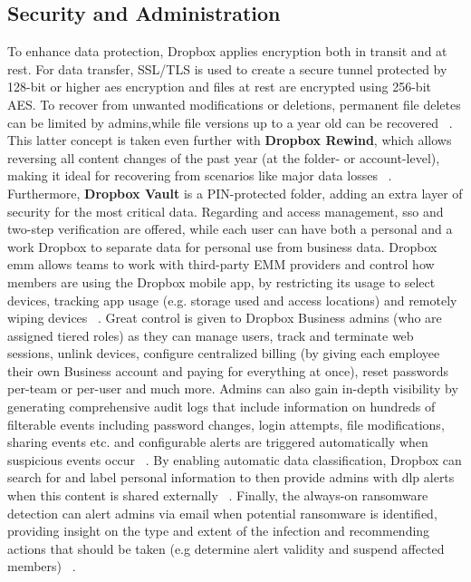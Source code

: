 \subsection{Security and Administration}
To enhance data protection, Dropbox applies encryption both in transit and at rest. For data transfer, SSL/TLS is used to create a secure tunnel protected by 128-bit or higher \ac{aes} encryption and files at rest are encrypted using 256-bit AES. To recover from unwanted modifications or deletions, permanent file deletes can be limited by admins,while file versions up to a year old can be recovered ~\cite{dropbox_security}. This latter concept is taken even further with \textbf{Dropbox Rewind}, which allows reversing all content changes of the past year (at the folder- or account-level), making it ideal for recovering from scenarios like major data losses ~\cite{dropbox_rewind}. Furthermore, \textbf{Dropbox Vault} is a PIN-protected folder, adding an extra layer of security for the most critical data. Regarding and access management, \ac{sso} and two-step verification are offered, while each user can have both a personal and a work Dropbox to separate data for personal use from business data. Dropbox \ac{emm} allows teams to work with third-party EMM providers and control how members are using the Dropbox mobile app, by restricting its usage to select devices, tracking app usage (e.g. storage used and access locations) and remotely wiping devices ~\cite{dropbox_emm}. Great control is given to Dropbox Business admins (who are assigned tiered roles) as they can manage users, track and terminate web sessions, unlink devices, configure centralized billing (by giving each employee their own Business account and paying for everything at once), reset passwords per-team or per-user and much more.  Admins can also gain in-depth visibility by generating comprehensive audit logs that include information on hundreds of filterable events including password changes, login attempts, file modifications, sharing events etc. and configurable alerts are triggered automatically when suspicious events occur ~\cite{dropbox_admin}. By enabling automatic data classification, Dropbox can search for and label personal information to then provide admins with \ac{dlp} alerts when this content is shared externally ~\cite{dropbox_dlp}. Finally, the always-on ransomware detection can alert admins via email when potential ransomware is identified, providing insight on the type and extent of the infection and recommending actions that should be taken (e.g determine alert validity and suspend affected members) ~\cite{dropbox_ransomware,dropbox}.

